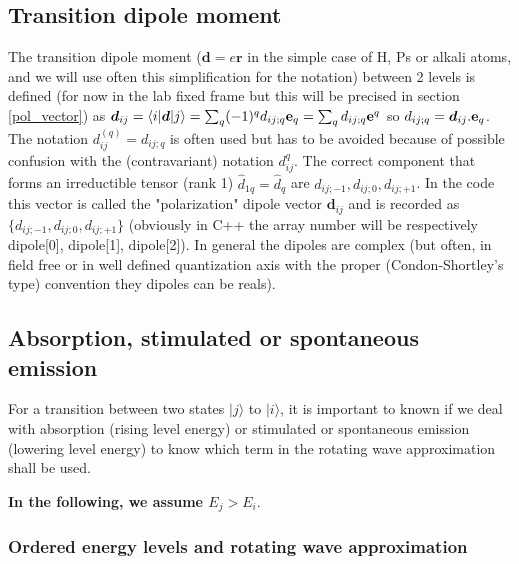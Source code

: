 \documentclass[amsmath,amssymb,nofootinbib]{revtex4-2}
\begin{document}
	
	 	 
	 	 \subsection{Transition dipole moment}
	 	 

	 	 
	 	 The transition dipole moment 
	 	 ($\bm d = e \bm r$ in the simple case of H, Ps or alkali atoms, and we will use often this simplification for the notation)
	 	 between 2 levels is defined (for now in the lab fixed frame but this will be precised in section \ref{pol_vector})  as
	 	 $ \bm d_{ij} = \langle i | \bm d | j \rangle = \sum_q (-1)^q d_{ij;q} {\bf{e}}_q = \sum_q d_{ij;q} {\bf{e}}^q $ so $ d_{ij;q} = \bm d_{ij}.{\bf{e}}_q$. The notation $d_{ij}^{(q)} = d_{ij;q}$ is often used but has to be avoided because of possible confusion with the (contravariant) notation $d_{ij}^{q}$.
	 	 The correct component that forms an irreductible tensor (rank 1) $\hat d_{1q} = \hat d_{q}$ are $ d_{ij;-1},d_{ij;0},d_{ij;+1} $. 
	 	 In the code this vector is called
	 	 the "polarization" dipole vector  $\bm d_{ij} $ and is recorded as $ \{ d_{ij;-1},d_{ij;0},d_{ij;+1} \} $ (obviously in C++ the array number will be respectively dipole[0], dipole[1], dipole[2]). In general the dipoles are complex (but often, in field free or in well defined quantization axis with the proper (Condon-Shortley's type) convention \cite{varshalovich1988quantum} they dipoles can be reals).
	 	 
	 	
	 	 	 	 

	 	 	
	 	 
	 	 \subsection{Absorption, stimulated or spontaneous emission}
	 	 
	 	 For a transition between two states $|j\rangle$ to $|i\rangle$,  it is important to known if we deal with absorption (rising level energy) or stimulated or spontaneous emission  (lowering level energy) to know which term in the rotating wave approximation shall be used. 
	 	 
	  \textbf{	 In the following, we assume $E_j> E_i$}.
	 	
	 		 		 	 \subsubsection{Ordered energy levels and rotating wave approximation}
	 		 		 	 
\end{document}
